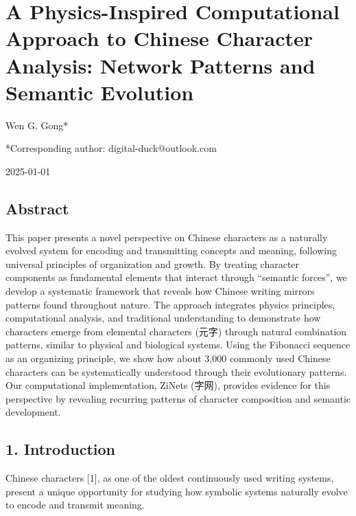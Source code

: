 \documentclass[
  11pt,
  letterpaper,
]{article}
\author{}
\date{}
\begin{document}
\hypertarget{a-physics-inspired-computational-approach-to-chinese-character-analysis-network-patterns-and-semantic-evolution}{%
\section{A Physics-Inspired Computational Approach to Chinese Character
Analysis: Network Patterns and Semantic
Evolution}\label{a-physics-inspired-computational-approach-to-chinese-character-analysis-network-patterns-and-semantic-evolution}}

Wen G. Gong*

*Corresponding author: digital-duck@outlook.com

2025-01-01

\hypertarget{abstract}{%
\subsection{Abstract}\label{abstract}}

This paper presents a novel perspective on Chinese characters as a
naturally evolved system for encoding and transmitting concepts and
meaning, following universal principles of organization and growth. By
treating character components as fundamental elements that interact
through ``semantic forces'', we develop a systematic framework that
reveals how Chinese writing mirrors patterns found throughout nature.
The approach integrates physics principles, computational analysis, and
traditional understanding to demonstrate how characters emerge from
elemental characters (元字) through natural combination patterns,
similar to physical and biological systems. Using the Fibonacci sequence
as an organizing principle, we show how about 3,000 commonly used
Chinese characters can be systematically understood through their
evolutionary patterns. Our computational implementation, ZiNets (字网),
provides evidence for this perspective by revealing recurring patterns
of character composition and semantic development.

\hypertarget{introduction}{%
\subsection{1. Introduction}\label{introduction}}

Chinese characters {[}1{]}, as one of the oldest continuously used
writing systems, present a unique opportunity for studying how symbolic
systems naturally evolve to encode and transmit meaning.
\end{document}
